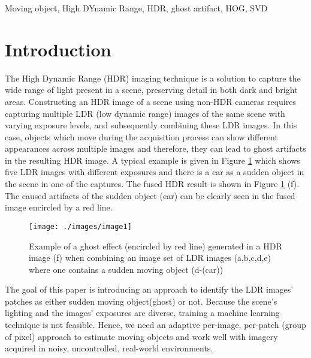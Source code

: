 \documentclass[preprint,12pt,3p]{elsarticle}
\begin{document}
\begin{frontmatter}
\begin{abstract}
\end{abstract}

\begin{keyword}
Moving object, High DYnamic Range, HDR, ghost artifact, HOG, SVD %
\end{keyword}

\end{frontmatter}


\section{Introduction}
\label{sec1}

The High Dynamic Range (HDR) imaging technique \cite{6} is a solution to capture the wide range of light present in a scene, preserving detail in both dark and bright areas. Constructing an HDR image of a scene using non-HDR cameras requires capturing multiple LDR (low dynamic range) images of the same scene with varying exposure levels, and subsequently combining these LDR images. In this case, objects which move during the acquisition process can show different appearances across multiple images and therefore, they can lead to ghost artifacts in the resulting HDR image. A typical example is given in Figure \ref{fig:image1} which shows five LDR images with different exposures and there is a car as a sudden object in the scene in one of the captures. The fused HDR result is shown in Figure \ref{fig:image1} (f). The caused artifacts of the sudden object (car) can be clearly seen in the fused image encircled by a red line.

\begin{figure}
\centering
\texttt{[image: ./images/image1]}
\caption{Example of a ghost effect (encircled by red line) generated in a HDR image (f) when combining an image set of LDR images (a,b,c,d,e) where one contains a sudden moving object (d-(car))}
\label{fig:image1}
\end{figure}

The goal of this paper is introducing an approach to identify the LDR images' patches as either sudden moving object(ghost) or not. Because the scene's lighting and the images' exposures are diverse, training a machine learning technique is not feasible. Hence, we need an adaptive per-image, per-patch (group of pixel) approach to estimate moving objects and work well with imagery acquired in noisy, uncontrolled, real-world environments.
\end{document}
